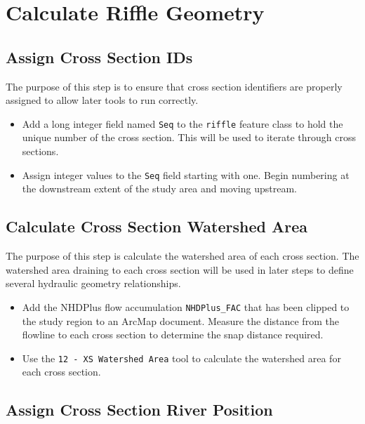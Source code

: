 \documentclass[]{book}
\providecommand{\tightlist}{%
  \setlength{\itemsep}{0pt}\setlength{\parskip}{0pt}}
\theoremstyle{definition}
\theoremstyle{definition}
\theoremstyle{definition}
\theoremstyle{remark}
\begin{document}
\section{Calculate Riffle Geometry}\label{calculate-riffle-geometry-1}

\subsection{Assign Cross Section IDs}\label{assign-cross-section-ids}

The purpose of this step is to ensure that cross section identifiers are
properly assigned to allow later tools to run correctly.

\begin{itemize}
\tightlist
\item
  Add a long integer field named \texttt{Seq} to the \texttt{riffle}
  feature class to hold the unique number of the cross section. This
  will be used to iterate through cross sections.
\item
  Assign integer values to the \texttt{Seq} field starting with one.
  Begin numbering at the downstream extent of the study area and moving
  upstream.
\end{itemize}

\subsection{Calculate Cross Section Watershed
Area}\label{calculate-cross-section-watershed-area}

The purpose of this step is calculate the watershed area of each cross
section. The watershed area draining to each cross section will be used
in later steps to define several hydraulic geometry relationships.

\begin{itemize}
\tightlist
\item
  Add the NHDPlus flow accumulation \texttt{NHDPlus\_FAC} that has been
  clipped to the study region to an ArcMap document. Measure the
  distance from the flowline to each cross section to determine the snap
  distance required.
\item
  Use the \texttt{12\ -\ XS\ Watershed\ Area} tool to calculate the
  watershed area for each cross section.
\end{itemize}

\subsection{Assign Cross Section River
Position}\label{assign-cross-section-river-position}
\end{document}
